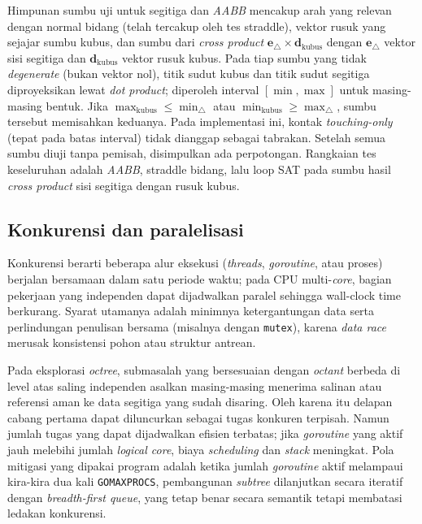 \documentclass[11pt,a4paper]{article}
\begin{document}
Himpunan sumbu uji untuk segitiga dan \textit{AABB} mencakup arah yang relevan dengan normal bidang (telah tercakup oleh tes straddle), vektor rusuk yang sejajar sumbu kubus, dan sumbu dari \textit{cross product} $\mathbf{e}_{\triangle} \times \mathbf{d}_{\text{kubus}}$ dengan $\mathbf{e}_{\triangle}$ vektor sisi segitiga dan $\mathbf{d}_{\text{kubus}}$ vektor rusuk kubus. Pada tiap sumbu yang tidak \textit{degenerate} (bukan vektor nol), titik sudut kubus dan titik sudut segitiga diproyeksikan lewat \textit{dot product}; diperoleh interval $[\min,\max]$ untuk masing-masing bentuk. Jika $\max_{\text{kubus}} \leq \min_{\triangle}$ atau $\min_{\text{kubus}} \geq \max_{\triangle}$, sumbu tersebut memisahkan keduanya. Pada implementasi ini, kontak \textit{touching-only} (tepat pada batas interval) tidak dianggap sebagai tabrakan. Setelah semua sumbu diuji tanpa pemisah, disimpulkan ada perpotongan. Rangkaian tes keseluruhan adalah \textit{AABB}, straddle bidang, lalu loop SAT pada sumbu hasil \textit{cross product} sisi segitiga dengan rusuk kubus.

\subsection{Konkurensi dan paralelisasi}

Konkurensi berarti beberapa alur eksekusi (\textit{threads}, \textit{goroutine}, atau proses) berjalan bersamaan dalam satu periode waktu; pada CPU multi-\textit{core}, bagian pekerjaan yang independen dapat dijadwalkan paralel sehingga wall-clock time berkurang. Syarat utamanya adalah minimnya ketergantungan data serta perlindungan penulisan bersama (misalnya dengan \texttt{mutex}), karena \textit{data race} merusak konsistensi pohon atau struktur antrean.

Pada eksplorasi \textit{octree}, submasalah yang bersesuaian dengan \textit{octant} berbeda di level atas saling independen asalkan masing-masing menerima salinan atau referensi aman ke data segitiga yang sudah disaring. Oleh karena itu delapan cabang pertama dapat diluncurkan sebagai tugas konkuren terpisah. Namun jumlah tugas yang dapat dijadwalkan efisien terbatas; jika \textit{goroutine} yang aktif jauh melebihi jumlah \textit{logical core}, biaya \textit{scheduling} dan \textit{stack} meningkat. Pola mitigasi yang dipakai program adalah ketika jumlah \textit{goroutine} aktif melampaui kira-kira dua kali \texttt{GOMAXPROCS}, pembangunan \textit{subtree} dilanjutkan secara iteratif dengan \textit{breadth-first queue}, yang tetap benar secara semantik tetapi membatasi ledakan konkurensi.
\end{document}
